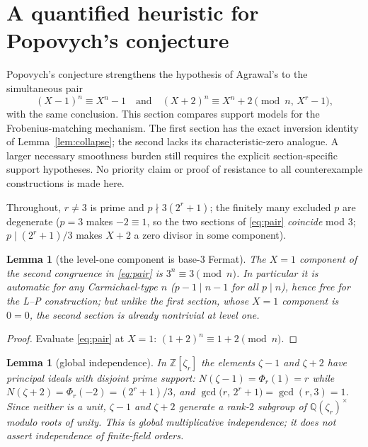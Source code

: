 \documentclass[11pt]{article}
\newtheorem{lemma}[theorem]{Lemma}
\theoremstyle{remark}
\newcommand{\Z}{\mathbb{Z}}
\newcommand{\Q}{\mathbb{Q}}
\begin{document}
\section{A quantified heuristic for Popovych's conjecture}\label{sec:popovych}

Popovych's conjecture \cite{Popovych09} strengthens the hypothesis of
Agrawal's to the simultaneous pair
\begin{equation}\label{eq:pair}
(X-1)^n \equiv X^n - 1
\quad\text{and}\quad
(X+2)^n \equiv X^n + 2 \pmod{n,\, X^r - 1},
\end{equation}
with the same conclusion. This section compares support models for the
Frobenius-matching mechanism. The first section has the exact inversion
identity of Lemma~\ref{lem:collapse}; the second lacks its characteristic-zero
analogue. A larger necessary smoothness burden still requires the explicit
section-specific support hypotheses. No priority claim or proof of resistance
to all counterexample constructions is made here.

Throughout, $r \ne 3$ is prime and $p \nmid 3(2^r+1)$; the finitely many
excluded $p$ are degenerate ($p = 3$ makes $-2 \equiv 1$, so the two sections
of \eqref{eq:pair} \emph{coincide} mod $3$; $p \mid (2^r+1)/3$ makes $X+2$ a
zero divisor in some component).

\begin{lemma}[the level-one component is base-$3$ Fermat]\label{lem:base3}
The $X = 1$ component of the second congruence in \eqref{eq:pair} is
$3^n \equiv 3 \pmod n$. In particular it is automatic for any Carmichael-type
$n$ ($p - 1 \mid n - 1$ for all $p \mid n$), hence free for the L--P
construction; but unlike the first section, whose $X=1$ component is
$0 = 0$, the second section is already nontrivial at level one.
\end{lemma}

\begin{proof}
Evaluate \eqref{eq:pair} at $X = 1$: $(1+2)^n \equiv 1 + 2 \pmod{n}$.
\end{proof}

\begin{lemma}[global independence]\label{lem:indep}
In $\Z[\zeta_r]$ the elements $\zeta - 1$ and $\zeta + 2$ have principal
ideals with disjoint prime support: $N(\zeta - 1) = \Phi_r(1) = r$ while
$N(\zeta + 2) = \Phi_r(-2) = (2^r+1)/3$, and
$\gcd\bigl(r,\, 2^r + 1\bigr) = \gcd(r, 3) = 1$. Since neither is a unit,
$\zeta - 1$ and $\zeta + 2$ generate a rank-$2$ subgroup of
$\Q(\zeta_r)^\times$ modulo roots of unity. This is global multiplicative
independence; it does not assert independence of finite-field orders.
\end{lemma}
\end{document}
